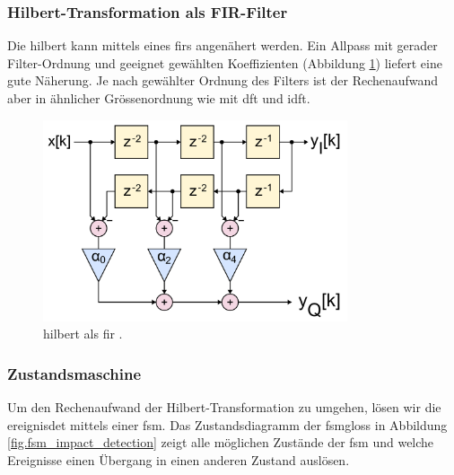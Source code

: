 \subsubsection{Hilbert-Transformation als FIR-Filter}
Die \gls{hilbert} kann mittels eines \gls{fir}s angenähert werden. Ein Allpass mit gerader Filter-Ordnung und geeignet gewählten Koeffizienten (Abbildung \ref{fig.hilbertFIR}) liefert eine gute Näherung. Je nach gewählter Ordnung des Filters ist der Rechenaufwand aber in ähnlicher Grössenordnung wie mit \gls{dft} und \gls{idft}.
\begin{figure}
	\centering
		\includegraphics[width=0.8\textwidth]{images/FIR_Hilbert_Transform_Filter.png}
	\caption{\gls{hilbert} als \gls{fir} \cite{wiki_hilbertFIR}.}
	\label{fig.hilbertFIR}
\end{figure}

\subsubsection{Zustandsmaschine}
Um den Rechenaufwand der Hilbert-Transformation zu umgehen, lösen wir die \gls{ereignisdet} mittels einer \gls{fsm}. Das Zustandsdiagramm der \gls{fsmgloss} in Abbildung \ref{fig.fsm_impact_detection} zeigt alle möglichen Zustände der \gls{fsm} und welche Ereignisse einen Übergang in einen anderen Zustand auslösen.

